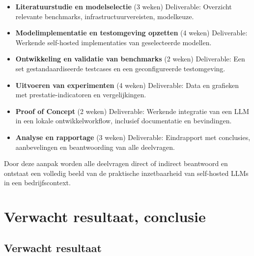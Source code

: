 \begin{itemize}
    \item \textbf{Literatuurstudie en modelselectie} (3 weken)  
    Deliverable: Overzicht relevante benchmarks, infrastructuurvereisten, modelkeuze.

    \item \textbf{Modelimplementatie en testomgeving opzetten} (4 weken)  
    Deliverable: Werkende self-hosted implementaties van geselecteerde modellen.

    \item \textbf{Ontwikkeling en validatie van benchmarks} (2 weken)  
    Deliverable: Een set gestandaardiseerde testcases en een geconfigureerde testomgeving.

    \item \textbf{Uitvoeren van experimenten} (4 weken)  
    Deliverable: Data en grafieken met prestatie-indicatoren en vergelijkingen.

    \item \textbf{Proof of Concept} (2 weken)  
    Deliverable: Werkende integratie van een LLM in een lokale ontwikkelworkflow, inclusief documentatie en bevindingen.

    \item \textbf{Analyse en rapportage} (3 weken)  
    Deliverable: Eindrapport met conclusies, aanbevelingen en beantwoording van alle deelvragen.
\end{itemize}

Door deze aanpak worden alle deelvragen direct of indirect beantwoord en ontstaat een volledig beeld van de praktische inzetbaarheid van self-hosted LLMs in een bedrijfscontext.

\section{Verwacht resultaat, conclusie}%
\label{sec:verwachte_resultaten}

\subsection{Verwacht resultaat}


